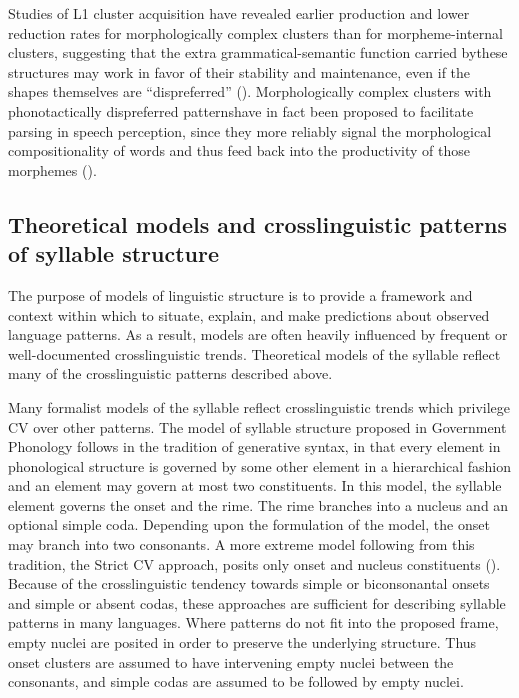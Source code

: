   Studies of L1 cluster acquisition have revealed earlier production and lower reduction rates for morphologically complex clusters than for morpheme-internal clusters, suggesting that the extra grammatical-semantic function carried by\linebreak these structures may work in favor of their stability and maintenance, even if the shapes themselves are ``dispreferred'' (\citealt{Kamandulyte2006,Zydorowicz2010}). Morphologically complex clusters with phonotactically dispreferred patterns\linebreak have in fact been proposed to facilitate parsing in speech perception, since they more reliably signal the morphological compositionality of words and thus feed back into the productivity of those morphemes (\citealt{HayBaayen2003,DresslerEtAl2010}). 

\subsection{Theoretical models and crosslinguistic patterns of syllable structure}\label{sec:1.1.3}

  The purpose of models of linguistic structure is to provide a framework and context within which to situate, explain, and make predictions about observed language patterns. As a result, models are often heavily influenced by frequent or well-documented crosslinguistic trends. Theoretical models of the syllable reflect many of the crosslinguistic patterns described above. 

  Many formalist models of the syllable reflect crosslinguistic trends which privilege CV over other patterns. The model of syllable structure proposed in Government Phonology \citep{KayeEtAl1990} follows in the tradition of generative syntax, in that every element in phonological structure is governed by some other element in a hierarchical fashion and an element may govern at most two constituents. In this model, the syllable element governs the onset and the rime. The rime branches into a nucleus and an optional simple coda. Depending upon the formulation of the model, the onset may branch into two consonants. A more extreme model following from this tradition, the Strict CV approach, posits only onset and nucleus constituents (\citealt{Lowenstamm1996,Scheer2004}). Because of the crosslinguistic tendency towards simple or biconsonantal onsets and simple or absent codas, these approaches are sufficient for describing syllable patterns in many languages. Where patterns do not fit into the proposed frame, empty nuclei are posited in order to preserve the underlying structure. Thus onset clusters are assumed to have intervening empty nuclei between the consonants, and simple codas are assumed to be followed by empty nuclei.

